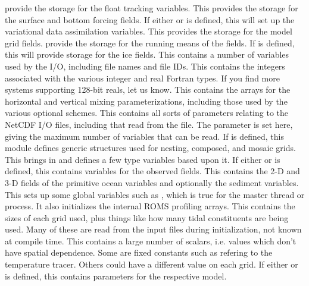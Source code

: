 \begin{klist}
    provide the storage for the float tracking variables.
   This
    provides the storage for the surface and bottom forcing fields.
   If either  or 
    is defined, this will set up the variational data assimilation
    variables.
   This provides the storage for the model grid fields. 
    provide the storage for the running means of the fields.
   If  is defined, this will provide
    storage for the ice fields.
   This contains a number of variables used by the
    I/O, including file names and file IDs.
    This contains the integers associated with the
    various integer and real Fortran types. If you find more systems
    supporting 128-bit reals, let us know.
   This contains the arrays for the horizontal and
    vertical mixing parameterizations, including those used by the various
    optional schemes.
   This contains all sorts of parameters relating to
    the NetCDF I/O files, including that read from the 
    file. The parameter  is set here, giving the maximum number of
    variables that can be read.
   If  is defined, this module defines
    generic structures used for nesting, composed, and mosaic grids.
   This brings in  and defines a few
    type variables based upon it.
   If either  or 
    is defined, this contains variables for the observed fields.
   This contains the 2-D and 3-D fields of the primitive
    ocean variables and optionally the sediment variables.
   This sets up some global variables such as
    , which is true for the master thread or
    process. It also initializes the internal ROMS profiling arrays.
   This contains the sizes of each grid used, plus
    things like how many tidal constituents are being used. Many of these are
    read from the input files during initialization, not known at compile
    time.
   This contains a large number of scalars, i.e. values
    which don't have spatial dependence. Some are fixed constants such
    as  refering to the temperature tracer. Others could
    have a different value on each grid.
   If either  or 
    is defined, this contains parameters for the respective model.

\end{klist}
